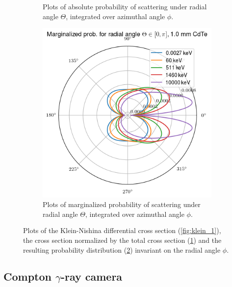 \documentclass[a4paper,12pt,titlepage, twoside]{article}
\begin{document}
\begin{figure}[ht]
\begin{subfigure}{0.30\textwidth}
    \caption{Plots of absolute probability of scattering under radial angle $\Theta$, integrated over azimuthal angle $\phi$.}
    \label{fig:klein_2}
  \end{subfigure}
  \begin{subfigure}{0.30\textwidth}
    \includegraphics[width=1.0\textwidth]{./fig/klein_nishina_3.png}
    \caption{Plots of marginalized probability of scattering under radial angle $\Theta$, integrated over azimuthal angle $\phi$.}
    \label{fig:klein_3}
  \end{subfigure}
  \caption{Plots of the Klein-Nishina differential cross section (\ref{fig:klein_1}), the cross section normalized by the total cross section (\ref{fig:klein_2}) and the resulting probability distribution (\ref{fig:klein_3}) invariant on the radial angle $\phi$.}
  \label{fig:klein_nishina}
\end{figure}



\subsection{Compton $\gamma$-ray camera}


\end{document}
